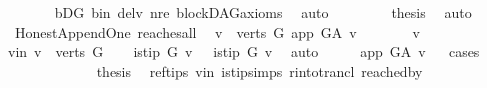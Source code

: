 \begin{isabellebody}
\ \ \ \ \ \ \isamarkupfalse%
\ bD{\isacharunderscore}{\kern0pt}G{}\ b{\isacharunderscore}{\kern0pt}in\ del{\isacharunderscore}{\kern0pt}v\ nre\ blockDAG{\isacharunderscore}{\kern0pt}axioms\ \isamarkupfalse%
\ auto\ \ \ \isanewline
\ \ \isamarkupfalse%
\ \isamarkupfalse%
\ {\isacharquery}{\kern0pt}thesis\ \isamarkupfalse%
\ auto\isanewline
{}\isamarkupfalse%
%
\endisatagproof
{\isafoldproof}%
%
\isadelimproof
%
\endisadelimproof
%
\isadelimdocument
%
\endisadelimdocument
%
\isatagdocument
%
\isamarkuptrue%
%
\endisatagdocument
{\isafolddocument}%
%
\isadelimdocument
%
\endisadelimdocument
{}\isamarkupfalse%
\ {\isacharparenleft}{\kern0pt}\ Honest{\isacharunderscore}{\kern0pt}Append{\isacharunderscore}{\kern0pt}One{\isacharparenright}{\kern0pt}\ reaches{\isacharunderscore}{\kern0pt}all{\isacharcolon}{\kern0pt}\isanewline
\ \ {\isachardoublequoteopen}{\isasymforall}v\ {\isasymin}\ verts\ G{\isachardot}{\kern0pt}\ app\ {\isasymrightarrow}\isactrlsup {\isacharplus}{\kern0pt}\isactrlbsub G{\isacharunderscore}{\kern0pt}A\isactrlesub \ v{\isachardoublequoteclose}\ \ \isanewline
%
\isadelimproof
%
\endisadelimproof
%
\isatagproof
{}\isamarkupfalse%
\ \isanewline
\ \ \isamarkupfalse%
\ v\ \isanewline
\ \ \isamarkupfalse%
\ v{\isacharunderscore}{\kern0pt}in{\isacharcolon}{\kern0pt}\ {\isachardoublequoteopen}v\ {\isasymin}\ verts\ G{\isachardoublequoteclose}\isanewline
\ \ \isamarkupfalse%
\ {\isachardoublequoteopen}is{\isacharunderscore}{\kern0pt}tip\ G\ v{\isachardoublequoteclose}\ {\isacharbar}{\kern0pt}\ {\isachardoublequoteopen}{\isasymnot}\ is{\isacharunderscore}{\kern0pt}tip\ G\ v{\isachardoublequoteclose}\ \isamarkupfalse%
\ auto\isanewline
\ \ \isamarkupfalse%
\ \isamarkupfalse%
\ {\isachardoublequoteopen}app\ {\isasymrightarrow}\isactrlsup {\isacharplus}{\kern0pt}\isactrlbsub G{\isacharunderscore}{\kern0pt}A\isactrlesub \ v{\isachardoublequoteclose}\isanewline
\ \ \isamarkupfalse%
{\isacharparenleft}{\kern0pt}cases{\isacharparenright}{\kern0pt}\isanewline
\ \ \ \ \isamarkupfalse%
\ {}\isanewline
\ \ \ \ \isamarkupfalse%
\ \isamarkupfalse%
\ {\isacharquery}{\kern0pt}thesis\ \isamarkupfalse%
\ ref{\isacharunderscore}{\kern0pt}tips\ v{\isacharunderscore}{\kern0pt}in\ is{\isacharunderscore}{\kern0pt}tip{\isachardot}{\kern0pt}simps\ r{\isacharunderscore}{\kern0pt}into{\isacharunderscore}{\kern0pt}trancl{\isacharprime}{\kern0pt}\ reached{\isacharunderscore}{\kern0pt}by\isanewline

\end{isabellebody}
